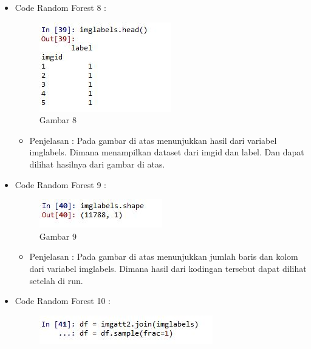 \begin{enumerate}
\begin{itemize}
\begin{itemize}
\par
\par
\end{itemize}
\item Code Random Forest 8 :
\par
\begin{figure}[ht]
\centering
\includegraphics[scale=0.2]{figures/AFS/4h.jpg}
\caption{Gambar 8}
\label{contoh}
\end{figure}
\par
\begin{itemize}
\item Penjelasan : Pada gambar di atas menunjukkan hasil dari variabel imglabels. Dimana menampilkan dataset dari imgid dan label. Dan dapat dilihat hasilnya dari gambar di atas.
\par
\par
\end{itemize}
\item Code Random Forest 9 :
\par
\begin{figure}[ht]
\centering
\includegraphics[scale=0.7]{figures/AFS/4i.jpg}
\caption{Gambar 9}
\label{contoh}
\end{figure}
\par
\begin{itemize}
\item Penjelasan : Pada gambar di atas menunjukkan jumlah baris dan kolom dari variabel imglabels. Dimana hasil dari kodingan tersebut dapat dilihat setelah di run. 
\par
\par
\end{itemize}
\item Code Random Forest 10 :
\par
\begin{figure}[ht]
\centering
\includegraphics[scale=0.7]{figures/AFS/4j.jpg}

\end{figure}
\end{itemize}
\end{enumerate}
